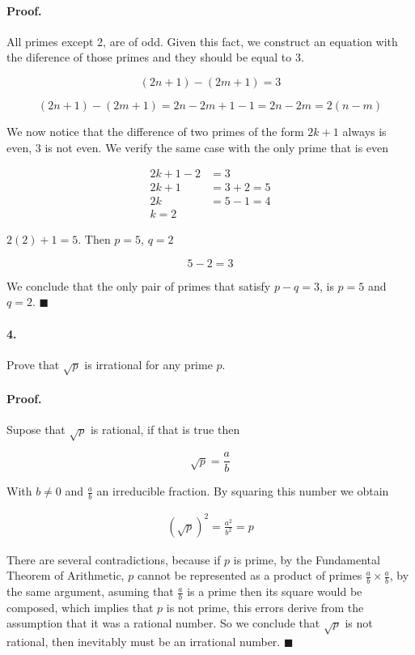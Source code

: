 \documentclass{article}
\begin{document}
\paragraph{Proof.} All primes except 2, are of odd. Given this fact, we construct an equation with the diference of those primes and they should be equal to 3.

$$(2n + 1) - (2m + 1) = 3$$

$$(2n + 1) - (2m + 1) = 2n - 2m + 1 - 1 = 2n - 2m = 2(n-m)$$

We now notice that the difference of two primes of the form $2k +1$ always is even, $3$ is not even. We verify the same case with the only prime that is even

\begin{align*}
    2k + 1 - 2 &= 3\\
    2k + 1 &= 3 + 2 = 5\\
    2k &= 5 - 1 = 4\\
    k = 2
\end{align*}

$2(2) + 1 = 5$. Then $p=5$, $q=2$

$$5 - 2 = 3$$

We conclude that the only pair of primes that satisfy $p - q =3$, is $p=5$ and $q=2$. $\blacksquare$

\paragraph{4.} Prove that $\sqrt{p}$ is irrational for any prime $p$.

\paragraph{Proof.} Supose that $\sqrt{p}$ is rational, if that is true then

$$\sqrt{p} = \frac{a}{b}$$

With $b \neq 0$ and $\frac{a}{b}$ an irreducible fraction. By squaring this number we obtain

\begin{align*}
    (\sqrt{p})^2 = \frac{a^2}{b^2} = p
\end{align*}

There are several contradictions, because if $p$ is prime, by the Fundamental Theorem of Arithmetic, $p$ cannot be represented as a product of primes $\frac{a}{b} \times \frac{a}{b}$, by the same argument, asuming that $\frac{a}{b}$ is a prime then its square would be composed, which implies that $p$ is not prime, this errors derive from the assumption that it was a rational number. So we conclude that $\sqrt{p}$ is not rational, then inevitably must be an irrational number. $\blacksquare$
\end{document}
